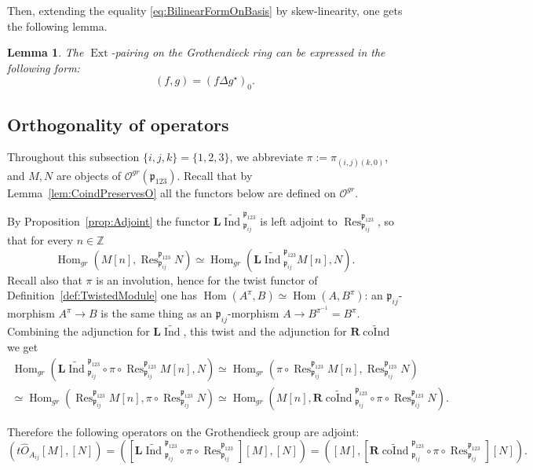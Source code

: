 \documentclass[10pt]{amsart}
\newtheorem{lemma}[theorem]{Lemma}
\newcommand{\fp}{{\mathfrak p}}
\newcommand{\Lind}{\mathbf{L}\widetilde{\Ind}}
\newcommand{\Rcoind}{\mathbf{R}\widetilde{\coInd}}
\DeclareMathOperator{\Res}{Res}
\DeclareMathOperator{\Ind}{Ind}
\DeclareMathOperator{\coInd}{coInd}
\DeclareMathOperator{\Hom}{Hom}
\DeclareMathOperator{\Ext}{Ext}
\begin{document}
	Then, extending the equality \eqref{eq:BilinearFormOnBasis} by skew-linearity, one gets the following lemma.
	
	\begin{lemma}\label{lem:ExtPairingExplicit}
		The $\Ext$-pairing on the Grothendieck ring can be expressed in the following form:
		\[(f,g)=(f \Delta g^\star)_0.\]
	\end{lemma}
	
	\subsection{Orthogonality of operators}
	Throughout this subsection $\{i,j,k\}=\{1,2,3\}$, we abbreviate $\pi:=\pi_{(i,j)(k,0)}$, and $M,N$ are objects of $\mathcal{O}^{gr}(\fp_{123})$. Recall that by Lemma~\ref{lem:CoindPreservesO} all the functors below are defined on $\mathcal{O}^{gr}$.
	
	By Proposition~\ref{prop:Adjoint} the functor ${\Lind}_{\fp_{ij}}^{\fp_{123}}$ is left adjoint to $\Res_{\fp_{ij}}^{\fp_{123}}$, so that for every $n \in \mathbb{Z}$
	\[\Hom_{gr}(M[n],\Res_{\fp_{ij}}^{\fp_{123}}N)\simeq
	\Hom_{gr}({\Lind}_{\fp_{ij}}^{\fp_{123}}M[n],N).\]
	Recall also that $\pi$ is an involution, hence for the twist functor of Definition~\ref{def:TwistedModule} one has $\Hom(A^{\pi},B)\simeq \Hom(A,B^{\pi})$: an $\fp_{ij}$-morphism $A^\pi \rightarrow B$ is the same thing as an $\fp_{ij}$-morphism $A \rightarrow B^{\pi^{-1}}=B^{\pi}$. Combining the adjunction for $\Lind$, this twist and the adjunction for $\Rcoind$ we get
	\begin{multline*}
		\Hom_{gr}({\Lind}_{\fp_{ij}}^{\fp_{123}}\circ \pi \circ \Res_{\fp_{ij}}^{\fp_{123}}M[n],N)\simeq  \Hom_{gr}(\pi \circ \Res_{\fp_{ij}}^{\fp_{123}} M[n],\Res_{\fp_{ij}}^{\fp_{123}} N)\\ \simeq 
		\Hom_{gr}(\Res_{\fp_{ij}}^{\fp_{123}}M[n],\pi \circ \Res_{\fp_{ij}}^{\fp_{123}} N)\simeq  \Hom_{gr}(M[n],{\Rcoind}_{\fp_{ij}}^{\fp_{123}}\circ \pi \circ \Res_{\fp_{ij}}^{\fp_{123}} N).
	\end{multline*}
	
	Therefore the following operators on the Grothendieck group are adjoint:
	\begin{equation}\label{eq:AdjointOperators}
		(t \hat O_{A_{ij}}[M],[N])=([{\Lind}_{\fp_{ij}}^{\fp_{123}}\circ \pi \circ \Res_{\fp_{ij}}^{\fp_{123}}][M],[N])= 
		([M],[{\Rcoind}_{\fp_{ij}}^{\fp_{123}}\circ \pi \circ \Res_{\fp_{ij}}^{\fp_{123}}][N]).
	\end{equation}
	
\end{document}
